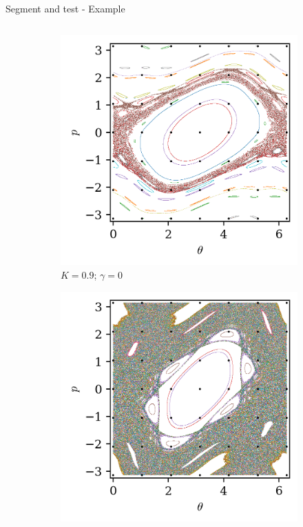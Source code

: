 \documentclass[10pt]{beamer}
\begin{document}
\begin{frame}{Segment and test - Example}
\begin{columns}[t]
\begin{column}{0.5\textwidth}
\begin{figure}
\begin{subfigure}[t]{0.4\textwidth}
                \includegraphics[width=\textwidth]{std/map_1_0.9000.png}
                \caption*{$K = 0.9$; $\gamma = 0$}
            \end{subfigure}
            \begin{subfigure}[t]{0.4\textwidth}
                \includegraphics[width=\textwidth]{std/map_1_1.5000.png}

\end{subfigure}
\end{figure}
\end{column}
\end{columns}
\end{frame}
\end{document}
